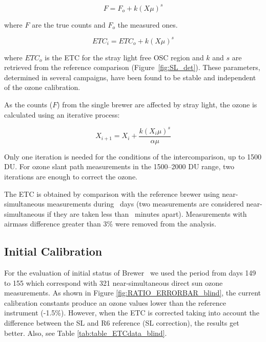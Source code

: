 \begin{equation}	
	F= F_o + k {(X \mu)}^s
\end{equation}

\noindent
where $F$ are the true counts and $F_o$ the measured ones.

\begin{equation}	
	ETC_i= ETC_o + k {(X \mu)}^s     
\label{eq:sl_etc}
\end{equation}

\noindent
where $ETC_o$ is the ETC for the stray light free OSC region and $k$ and $s$ are retrieved from the reference comparison (Figure~\ref{fig:SL_det}). These parameters, determined in several campaigns, have been found to be stable and independent of the ozone calibration.  

As the counts ($F$) from the single brewer are affected by stray light, the ozone is calculated using an iterative process:

\begin{equation}	
	X_{i+1}= X_i + \frac { k {(X_i \mu)}^s} { \alpha\mu}
	\label{eq:stray_iter}
\end{equation}         	                  	        	                        

Only one iteration is needed for the conditions of the intercomparison, up to 1500 DU. For ozone slant path measurements in the 1500--2000 DU range, two iterations are enough to correct the ozone.%

The ETC is obtained by comparison with the reference brewer \textbf{\brwref} using near-simultaneous measurements during \textbf{\caldays}\ days (two measurements are considered near-simultaneous if they are taken less than \textbf{\Tsync}\ minutes apart). Measurements with airmass difference greater than 3\% were removed from the analysis.


\subsection{Initial Calibration}

For the evaluation of initial status of Brewer \brwname\, we used the period from days 149 to 155 which correspond with 321 near-simultaneous direct sun ozone measurements. As shown in Figure \ref{fig:RATIO_ERRORBAR_blind}, the current calibration constants produce an ozone values lower than the reference instrument (-1.5\%). However, when the ETC is corrected taking into account the difference between the SL and R6 reference (SL correction), the results get better. Also, see Table \ref{tab:table_ETCdata_blind}.

